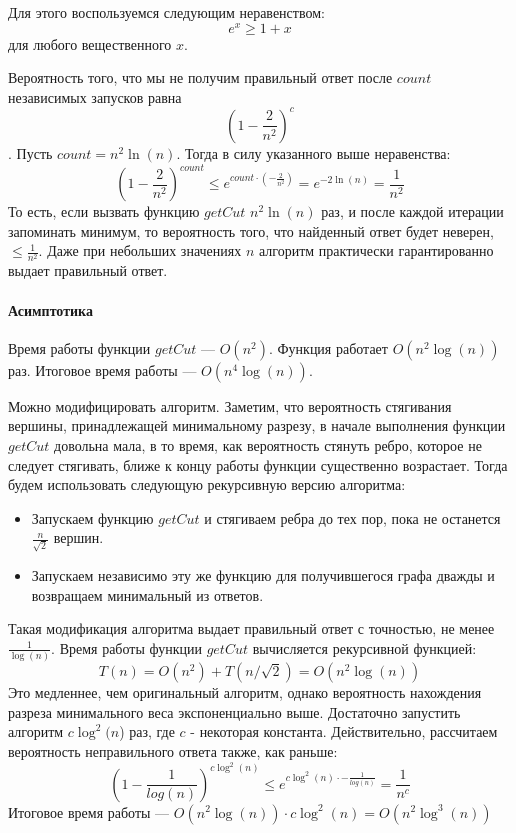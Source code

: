 \documentclass[a4paper,12pt]{article}
\begin{document}
Для этого воспользуемся следующим неравенством:\[e^x \geqslant 1 + x\] для любого вещественного $x$.

Вероятность того, что мы не получим правильный ответ после $count$ независимых запусков равна\[(1-\frac{2}{n^2})^c\].
Пусть $count = n^2\ln(n)$. Тогда в силу указанного выше неравенства:\[(1-\frac{2}{n^2})^{count} \leqslant e^{count \cdot (-\frac{2}{n^2})} = e^{-2 \ln(n)} = \frac{1}{n^2}\]
То есть, если вызвать функцию $getCut$  $n^2\ln(n)$ раз, и после каждой итерации запоминать минимум, то вероятность того, что найденный ответ будет неверен, $\leqslant \frac{1}{n^2}$. Даже при небольших значениях $n$ алгоритм практически гарантированно выдает правильный ответ.

\paragraph{Асимптотика}

Время работы функции $getCut$ — $O(n^2)$. Функция работает $O(n^2\log(n))$ раз. Итоговое время работы — $O(n^4 \log(n))$.

Можно модифицировать алгоритм. Заметим, что вероятность стягивания вершины, принадлежащей минимальному разрезу, в начале выполнения функции $getCut$ довольна мала, в то время, как вероятность стянуть ребро, которое не следует стягивать, ближе к концу работы функции существенно возрастает. Тогда будем использовать следующую рекурсивную версию алгоритма:
\begin{itemize}
    \item Запускаем функцию $getCut$ и стягиваем ребра до тех пор, пока не останется $\frac{n}{\sqrt{2}}$ вершин.
    \item Запускаем независимо эту же функцию для получившегося графа дважды и возвращаем минимальный из ответов.
\end{itemize}
Такая модификация алгоритма выдает правильный ответ с точностью, не менее $\frac{1}{\log(n)}$. Время работы функции $getCut$ вычисляется рекурсивной функцией:\[T(n) = O(n^2) + T(n/\sqrt{2}) = O(n^2\log(n))\]
Это медленнее, чем оригинальный алгоритм, однако вероятность нахождения разреза минимального веса экспоненциально выше. Достаточно запустить алгоритм $c\log^2(n$) раз, где $c$ - некоторая константа. Действительно, рассчитаем вероятность неправильного ответа также, как раньше:\[(1-\frac{1}{log(n)})^{c\log^2(n)} \leqslant e^{c\log^2(n) \cdot -\frac{1}{log(n)}} = \frac{1}{n^c}\]
Итоговое время работы — $O(n^2\log(n)) \cdot c\log^2(n) = O(n^2\log^3(n))$
\end{document}
